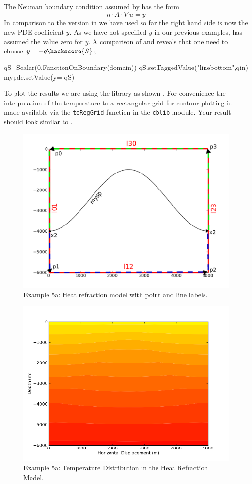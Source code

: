 The Neuman boundary condition assumed by \esc has the form
\begin{equation}\label{NEUMAN 2b}
n\cdot A \cdot\nabla u = y 
\end{equation}
In comparison to the version in  we have used so far the right hand side is now 
the new PDE coefficient $y$. As we have not specified $y$ in our previous examples, \esc has assumed
the value zero for $y$. A comparison of  and  reveals that one need to
choose $y=-q\hackscore{S}$;
\begin{python}
qS=Scalar(0,FunctionOnBoundary(domain))
qS.setTaggedValue("linebottom",qin)
mypde.setValue(y=-qS)
\end{python}
To plot the results we are using the \modmpl library as shown . For convenience
the interpolation of the temperature to a rectangular grid for contour plotting is made available
via the \verb|toRegGrid| function in the \verb|cblib| module. Your result should look similar to 
.

\begin{figure}[ht]
\centerline{\includegraphics[width=4.in]{figures/anticlineheatrefraction}}
\caption{Example 5a: Heat refraction model with point and line labels.}
\label{fig:anticlinehrmodel}
\end{figure}

\begin{figure}[ht]
\centerline{\includegraphics[width=4.in]{figures/heatrefraction}}
\caption{Example 5a: Temperature Distribution in the Heat Refraction Model.}
\label{fig:anticlinetemp}
\end{figure}

